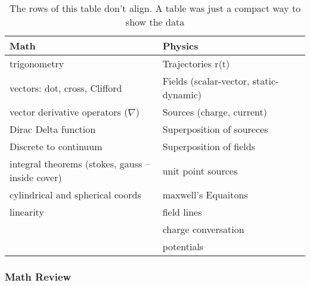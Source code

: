 \documentclass[11pt]{article}
\begin{document}
\begin{table}[htb]
\caption{The rows of this table don't align. A table was just a compact way to show the data}
\begin{center}
\begin{tabular}{llll}
 Math                                               &  Physics                                 &     &     \\
\hline
 trigonometry                                       &  Trajectories r(t)                       &     &     \\
 vectors: dot, cross, Clifford                      &  Fields (scalar-vector, static-dynamic)  &     &     \\
 vector derivative operators ($\nabla$)             &  Sources (charge, current)               &     &     \\
 Dirac Delta function                               &  Superposition of soureces               &     &     \\
 Discrete to continuum                              &  Superposition of fields                 &     &     \\
 integral theorems (stokes, gauss -- inside cover)  &  unit point sources                      &     &     \\
 cylindrical and spherical coords                   &  maxwell's Equaitons                     &     &     \\
 linearity                                          &  field lines                             &     &     \\
                                                    &  charge conversation                     &     &     \\
                                                    &  potentials                              &     &     \\
\end{tabular}
\end{center}
\end{table}
\subsubsection{Math Review}
\label{sec-2-2-1}
\end{document}
